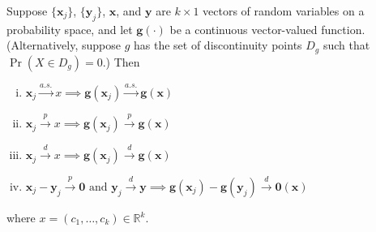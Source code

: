 
\begin{theorem}\label{asym.contmappthm}Suppose \(\{\boldsymbol{x}_j\}\), \(\{\boldsymbol{y}_j\}\), \(\boldsymbol{x}\), and \(\boldsymbol{y}\) are \(k \times 1\) vectors of random variables on a probability space, and let \(\boldsymbol{g}(\cdot)\) be a continuous vector-valued function. (Alternatively, suppose \(g\) has the set of discontinuity points \(D_g\) such that \(\Pr(X \in D_g) = 0\).) Then

\begin{enumerate}[(i)]

\item \(\boldsymbol{x}_j \xrightarrow{a.s.} x \implies \boldsymbol{g}(\boldsymbol{x}_j) \xrightarrow{a.s.} \boldsymbol{g}(\boldsymbol{x})\)

\item \(\boldsymbol{x}_j \xrightarrow{p} x \implies \boldsymbol{g}(\boldsymbol{x}_j) \xrightarrow{p} \boldsymbol{g}(\boldsymbol{x})\)

\item \(\boldsymbol{x}_j \xrightarrow{d} x \implies \boldsymbol{g}(\boldsymbol{x}_j) \xrightarrow{d} \boldsymbol{g}(\boldsymbol{x})\)

\item \(\boldsymbol{x}_j  - \boldsymbol{y}_j \xrightarrow{p} \boldsymbol{0} \text{ and } \boldsymbol{y}_j \xrightarrow{d} \boldsymbol{y} \implies \boldsymbol{g}(\boldsymbol{x}_j) - \boldsymbol{g}(\boldsymbol{y}_j) \xrightarrow{d} \boldsymbol{0}(\boldsymbol{x})\)

\end{enumerate}

where \(x = (c_1, \ldots, c_k) \in \mathbb{R}^k\).

\end{theorem}

